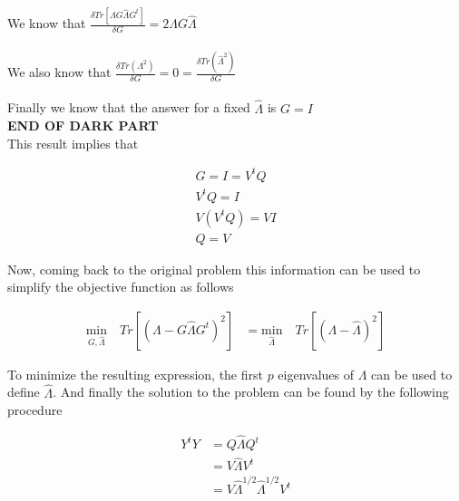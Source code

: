 \documentclass[12pt,journal]{IEEEtran}
\begin{document}
    We know that $\frac{\delta Tr[\Lambda G \hat{\Lambda} G^t]}{\delta G} = 2\Lambda G \hat{\Lambda}$\\\\
    We also know that $\frac{\delta Tr(\Lambda^2)}{\delta G} = 0 = \frac{\delta Tr(\hat{\Lambda}^2)}{\delta G}$\\\\
    Finally we know that the answer for a fixed $\hat{\Lambda}$ is $G=I$\\

    \textbf{END OF DARK PART}\\

    This result implies that

    \begin{equation*}
        \begin{aligned}
        G = I = V^tQ\\
        V^tQ = I\\
        V(V^tQ) = VI\\
        Q = V
        \end{aligned}
    \end{equation*}

    Now, coming back to the original problem this information can be used to
    simplify the objective function as follows

    \begin{equation*}
        \begin{aligned}
            \underset{G,\hat{\Lambda}}{\text{min}} \quad Tr[(\Lambda - G \hat{\Lambda} G^t)^2]
            &=
            \underset{\hat{\Lambda}}{\text{min}} \quad Tr[(\Lambda - \hat{\Lambda})^2]
        \end{aligned}
    \end{equation*}

    To minimize the resulting expression, the first $p$ eigenvalues of $\Lambda$
    can be used to define $\hat{\Lambda}$. And finally the solution to the
    problem can be found by the following procedure

    \begin{equation*}
        \begin{aligned}
            Y^tY &= Q \hat{\Lambda} Q^t\\
            &=
            V \hat{\Lambda} V^t\\
            &=
            V \hat{\Lambda}^{1/2} \hat{\Lambda}^{1/2} V^t\\
        \end{aligned}
    \end{equation*}
\end{document}
